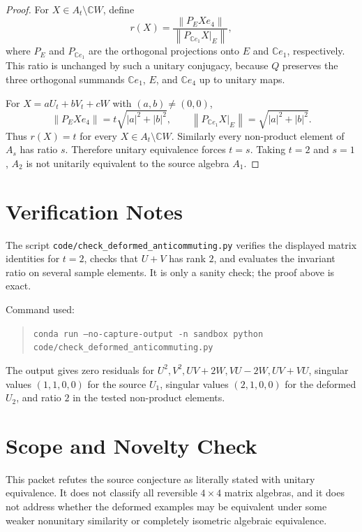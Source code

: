 \documentclass[11pt]{article}
\newcommand{\C}{\mathbb C}
\newcommand{\norm}[1]{\left\lVert #1 \right\rVert}
\begin{document}
\begin{proof}
For \(X\in A_t\setminus\C W\), define
\[
   r(X)=
   \frac{\norm{P_E X e_4}}
        {\norm{P_{\C e_1}X|_E}},
\]
where \(P_E\) and \(P_{\C e_1}\) are the orthogonal projections onto \(E\) and
\(\C e_1\), respectively.  This ratio is unchanged by such a unitary
conjugacy, because \(Q\) preserves the three orthogonal summands
\(\C e_1\), \(E\), and \(\C e_4\) up to unitary maps.

For \(X=aU_t+bV_t+cW\) with \((a,b)\neq(0,0)\),
\[
   \norm{P_E X e_4}=t\sqrt{|a|^2+|b|^2},
   \qquad
   \norm{P_{\C e_1}X|_E}=\sqrt{|a|^2+|b|^2}.
\]
Thus \(r(X)=t\) for every \(X\in A_t\setminus\C W\).  Similarly every
non-product element of \(A_s\) has ratio \(s\).  Therefore unitary equivalence
forces \(t=s\).  Taking \(t=2\) and \(s=1\), \(A_2\) is not unitarily
equivalent to the source algebra \(A_1\).
\end{proof}

\section*{Verification Notes}

The script \texttt{code/check\_deformed\_anticommuting.py} verifies the
displayed matrix identities for \(t=2\), checks that \(U+V\) has rank \(2\),
and evaluates the invariant ratio on several sample elements.  It is only a
sanity check; the proof above is exact.

Command used:
\begin{quote}
\texttt{conda run --no-capture-output -n sandbox python}\\
\texttt{code/check\_deformed\_anticommuting.py}
\end{quote}

The output gives zero residuals for \(U^2,V^2,UV+2W,VU-2W,UV+VU\), singular
values \((1,1,0,0)\) for the source \(U_1\), singular values \((2,1,0,0)\) for
the deformed \(U_2\), and ratio \(2\) in the tested non-product elements.

\section*{Scope and Novelty Check}

This packet refutes the source conjecture as literally stated with unitary
equivalence.  It does not classify all reversible \(4\times4\) matrix algebras,
and it does not address whether the deformed examples may be equivalent under
some weaker nonunitary similarity or completely isometric algebraic
equivalence.
\end{document}
